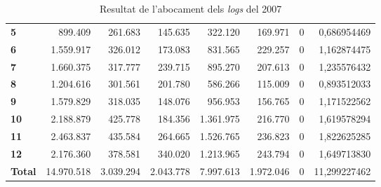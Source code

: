 \begin{table}[h!]
\begin{adjustbox}{width=1.2\textwidth, center}
\begin{tabular}{|l|r|r|r|r|r|r|r|}
            \midrule
            \textbf{5}     & 899.409    & 261.683   & 145.635   & 322.120   & 169.971   & 0 & 0,686954469  \\
            \textbf{6}     & 1.559.917  & 326.012   & 173.083   & 831.565   & 229.257   & 0 & 1,162874475  \\
            \textbf{7}     & 1.660.375  & 317.777   & 239.715   & 895.270   & 207.613   & 0 & 1,235576432  \\
            \textbf{8}     & 1.204.616  & 301.561   & 201.780   & 586.266   & 115.009   & 0 & 0,893512033  \\
            \midrule
            \textbf{9}     & 1.579.829  & 318.035   & 148.076   & 956.953   & 156.765   & 0 & 1,171522562  \\
            \textbf{10}    & 2.188.879  & 425.778   & 184.356   & 1.361.975 & 216.770   & 0 & 1,619578294  \\
            \textbf{11}    & 2.463.837  & 435.584   & 264.665   & 1.526.765 & 236.823   & 0 & 1,822625285  \\
            \textbf{12}    & 2.176.360  & 378.581   & 340.020   & 1.213.965 & 243.794   & 0 & 1,649713830  \\
            \midrule
            \textbf{Total} & 14.970.518 & 3.039.294 & 2.043.778 & 7.997.613 & 1.972.046 & 0 & 11,299227462 \\
            \bottomrule
        \end{tabular}
    \end{adjustbox}
    \caption{Resultat de l'abocament dels \textit{logs} del 2007}
    \label{tab:logs-table-2007}
\end{table}
